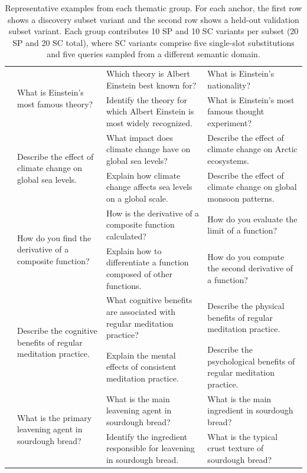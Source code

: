 \begin{table}[!htbp]
\begin{tabular}{p{1.75cm} p{2.25cm} p{4.25cm} p{4.25cm}}
\addlinespace
\multirow{2}{*}{Einstein} &
\multirow{2}{=}{What is Einstein's most famous theory?} &
Which theory is Albert Einstein best known for? &
What is Einstein's nationality? \\
& & Identify the theory for which Albert Einstein is most widely recognized. &
What is Einstein's most famous thought experiment? \\
\addlinespace
\multirow{2}{*}{Climate Change} &
\multirow{2}{=}{Describe the effect of climate change on global sea levels.} &
What impact does climate change have on global sea levels? &
Describe the effect of climate change on Arctic ecosystems. \\
& & Explain how climate change affects sea levels on a global scale. &
Describe the effect of climate change on global monsoon patterns. \\
\addlinespace
\multirow{2}{*}{Calculus} &
\multirow{2}{=}{How do you find the derivative of a composite function?} &
How is the derivative of a composite function calculated? &
How do you evaluate the limit of a function? \\
& & Explain how to differentiate a function composed of other functions. &
How do you compute the second derivative of a function? \\
\addlinespace
\multirow{2}{*}{Meditation} &
\multirow{2}{=}{Describe the cognitive benefits of regular meditation practice.} &
What cognitive benefits are associated with regular meditation practice? &
Describe the physical benefits of regular meditation practice. \\
& & Explain the mental effects of consistent meditation practice. &
Describe the psychological benefits of regular meditation practice. \\
\addlinespace
\multirow{2}{*}{Bread} &
\multirow{2}{=}{What is the primary leavening agent in sourdough bread?} &
What is the main leavening agent in sourdough bread? &
What is the main ingredient in sourdough bread? \\
& & Identify the ingredient responsible for leavening in sourdough bread. &
What is the typical crust texture of sourdough bread? \\
\bottomrule
\end{tabular}
\vspace{0.4em}
\caption{Representative examples from each thematic group. For each anchor, the first row shows a discovery subset variant and the second row shows a held-out validation subset variant. Each group contributes 10 SP and 10 SC variants per subset (20 SP and 20 SC total), where SC variants comprise five single-slot substitutions and five queries sampled from a different semantic domain.}
\label{tab:dataset_examples}
\end{table}

